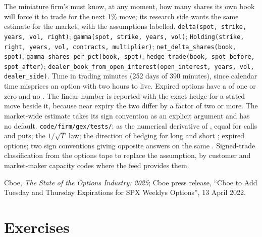 \begin{build}
 The miniature firm's  must know, at any
moment, how many shares its own book will force it to trade for the next 1\%
move; its research side wants the same estimate for the market, with the
assumptions labelled.
 \texttt{delta(spot, strike, years, vol, right)};
\texttt{gamma(spot, strike, years, vol)}; \texttt{Holding(strike, right,
years, vol, contracts, multiplier)}; \texttt{net\_delta\_shares(book, spot)};
\texttt{gamma\_shares\_per\_pct(book, spot)}; \texttt{hedge\_trade(book,
spot\_before, spot\_after)};
\texttt{dealer\_book\_from\_open\_interest(open\_interest, years, vol,
dealer\_side)}.
 Time in trading minutes (252 days of 390 minutes), since
calendar time misprices an option with two hours to live. Expired options have
a  of one or zero and no . The linear number is reported with the
exact hedge for a stated move beside it, because near expiry the two differ
by a factor of two or more. The market-wide estimate takes its sign
convention as an explicit argument and has no default.
 \texttt{code/firm/gex/tests/}:  as the
numerical derivative of , equal for calls and puts; the $1/\sqrt T$ law;
the direction of hedging for long and short ; expired options; two sign
conventions giving opposite answers on the same .
 Signed-trade classification from the options tape to
replace the assumption, by customer and market-maker capacity codes where
the feed provides them.
\end{build}

\begin{omsources}
\item Cboe, \emph{The State of the Options Industry: 2025}; Cboe press
release, ``Cboe to Add Tuesday and Thursday Expirations for SPX Weeklys
Options'', 13 April 2022.
\end{omsources}

\section{Exercises}

